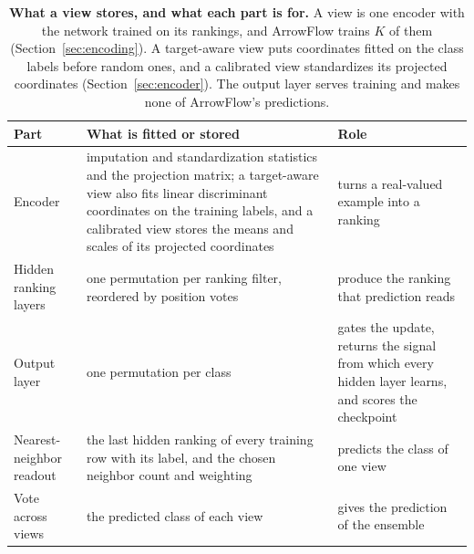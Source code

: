\begin{table}[!htbp]
\caption{\textbf{What a view stores, and what each part is for.} A view is one encoder with the network trained on its rankings, and ArrowFlow trains $K$ of them (Section~\ref{sec:encoding}). A target-aware view puts coordinates fitted on the class labels before random ones, and a calibrated view standardizes its projected coordinates (Section~\ref{sec:encoder}). The output layer serves training and makes none of ArrowFlow's predictions.}
\label{tab:overview}
\centering
\footnotesize
\begin{tabular}{@{}p{} p{} p{}@{}}
\toprule
Part & What is fitted or stored & Role \\
\midrule
Encoder & imputation and standardization statistics and the projection matrix; a target-aware view also fits linear discriminant coordinates on the training labels, and a calibrated view stores the means and scales of its projected coordinates & turns a real-valued example into a ranking \\
\addlinespace
Hidden ranking layers & one permutation per ranking filter, reordered by position votes & produce the ranking that prediction reads \\
\addlinespace
Output layer & one permutation per class & gates the update, returns the signal from which every hidden layer learns, and scores the checkpoint \\
\addlinespace
Nearest-neighbor readout & the last hidden ranking of every training row with its label, and the chosen neighbor count and weighting & predicts the class of one view \\
\addlinespace
Vote across views & the predicted class of each view & gives the prediction of the ensemble \\
\bottomrule
\end{tabular}
\end{table}
